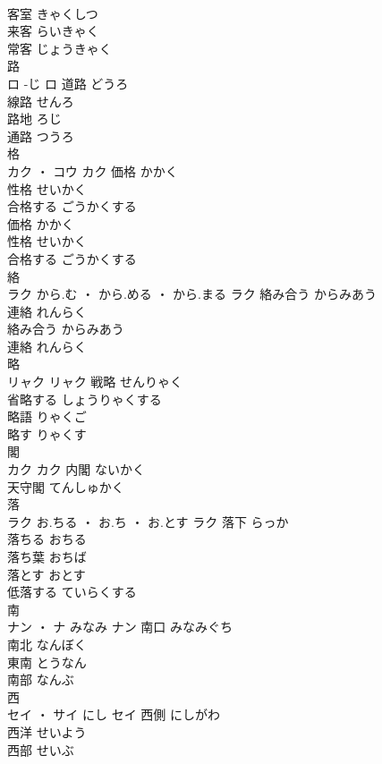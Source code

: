 \documentclass[8pt]{extreport}
\begin{document}
\begin{CJK}{UTF8}{min}
\\	客室	きゃくしつ	
\\	来客	らいきゃく	
\\	常客	じょうきゃく	
\\	路	
\\	ロ	-じ	ロ	道路	どうろ	
\\	線路	せんろ	
\\	路地	ろじ	
\\	通路	つうろ	
\\	格	
\\	カク ・ コウ		カク	価格	かかく	
\\	性格	せいかく	
\\	合格する	ごうかくする	
\\	価格	かかく	
\\	性格	せいかく	
\\	合格する	ごうかくする	
\\	絡	
\\	ラク	から.む ・ から.める ・ から.まる	ラク	絡み合う	からみあう	
\\	連絡	れんらく	
\\	絡み合う	からみあう	
\\	連絡	れんらく	
\\	略	
\\	リャク		リャク	戦略	せんりゃく	
\\	省略する	しょうりゃくする	
\\	略語	りゃくご	
\\	略す	りゃくす	
\\	閣	
\\	カク		カク	内閣	ないかく	
\\	天守閣	てんしゅかく	
\\	落	
\\	ラク	お.ちる ・ お.ち ・ お.とす	ラク	落下	らっか	
\\	落ちる	おちる	
\\	落ち葉	おちば	
\\	落とす	おとす	
\\	低落する	ていらくする	
\\	南	
\\	ナン ・ ナ	みなみ	ナン	南口	みなみぐち	
\\	南北	なんぼく	
\\	東南	とうなん	
\\	南部	なんぶ	
\\	西	
\\	セイ ・ サイ	にし	セイ	西側	にしがわ	
\\	西洋	せいよう	
\\	西部	せいぶ	

\end{CJK}
\end{document}
